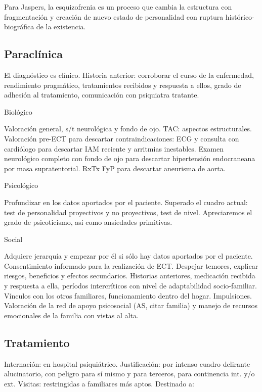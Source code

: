 Para Jaspers, la esquizofrenia es un proceso que cambia la estructura con fragmentación y creación de nuevo estado de personalidad con ruptura histórico-biográfica de la existencia.

\subsection*{Paraclínica}

El diagnóstico es clínico. Historia anterior: corroborar el curso de la enfermedad, rendimiento pragmático, tratamientos recibidos y respuesta a ellos, grado de adhesión al tratamiento, comunicación con psiquiatra tratante.

Biológico

Valoración general, s/t neurológica y fondo de ojo. TAC: aspectos estructurales. Valoración pre-ECT para descartar contraindicaciones: ECG y consulta con cardiólogo para descartar IAM reciente y arritmias inestables. Examen neurológico completo con fondo de ojo para descartar hipertensión endocraneana por masa supratentorial. RxTx FyP para descartar aneurisma de aorta.

Psicológico

Profundizar en los datos aportados por el paciente. Superado el cuadro actual: test de personalidad proyectivos y no proyectivos, test de nivel. Apreciaremos el grado de psicoticismo, así como ansiedades primitivas.

Social

Adquiere jerarquía y empezar por él si sólo hay datos aportados por el paciente. Consentimiento informado para la realización de ECT. Despejar temores, explicar riesgos, beneficios y efectos secundarios. Historias anteriores, medicación recibida y respuesta a ella, períodos intercríticos con nivel de adaptabilidad socio-familiar. Vínculos con los otros familiares, funcionamiento dentro del hogar. Impulsiones. Valoración de la red de apoyo psicosocial (AS, citar familia) y manejo de recursos emocionales de la familia con vistas al alta.

\subsection*{Tratamiento}

Internación: en hospital psiquiátrico. Justificación: por intenso cuadro delirante alucinatorio, con peligro para sí mismo y para terceros, para continencia int. y/o ext. Visitas: restringidas a familiares más aptos. Destinado a:

